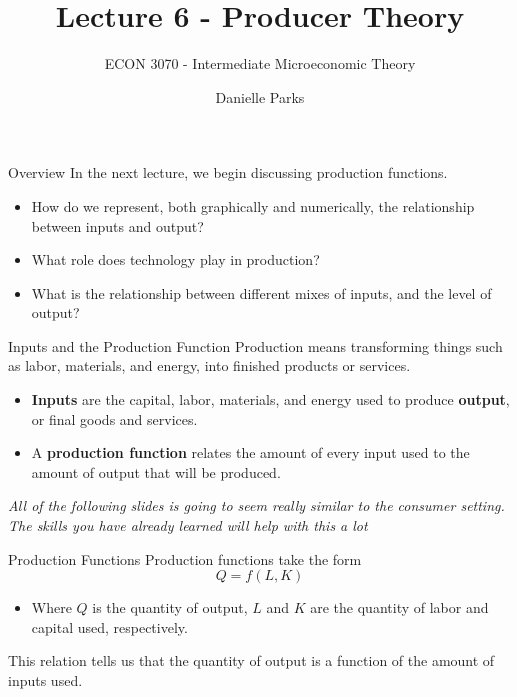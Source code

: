 \documentclass{beamer}
\author{Danielle Parks}
\title{Lecture 6  - Producer Theory}
\subtitle{ECON 3070 - Intermediate Microeconomic Theory}
\begin{document}
\begin{frame}
  \titlepage
\end{frame}

\begin{frame}{Overview}
  In the next lecture, we begin discussing production functions.
  
  \bigskip
  \begin{itemize}
    \item How do we represent, both graphically and numerically, the relationship between inputs and output?

    \item What role does technology play in production?

    \item What is the relationship between different mixes of inputs, and the level of output?
  \end{itemize}
\end{frame}

\begin{frame}{Inputs and the Production Function}
  Production means transforming things such as labor, materials, and energy, into finished products or services.
  
  \bigskip
  \begin{itemize}
    \item \textbf{Inputs} are the capital, labor, materials, and energy used to produce \textbf{output}, or final goods and services.

    \item A \textbf{production function} relates the amount of every input used to the amount of output that will be produced.
  \end{itemize}

  \bigskip
  \begin{center}
    \emph{All of the following slides is going to seem really similar to the consumer setting. The skills you have already learned will help with this a lot}
  \end{center}
\end{frame}

\begin{frame}{Production Functions}
  Production functions take the form
  \begin{equation*}
    Q=f(L,K)
  \end{equation*}
  
  \bigskip
  \begin{itemize}
    \item Where $Q$ is the quantity of output, $L$ and $K$ are the quantity of labor and capital used, respectively.

  \end{itemize}
  
  \bigskip
  This relation tells us that the quantity of output is a function of the amount of inputs used.
\end{frame}
\end{document}

